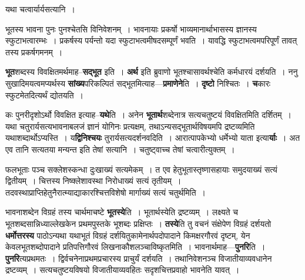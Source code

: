 \documentclass[article,12pt,a4paper]{memoir}
\begin{document}
	  \pstart यथा चत्वार्यार्यसत्यानि ।
	\pend
      
	  \bigskip
	  \begingroup
	

	  \pstart भूतस्य भावना पुनः पुनश्चेतसि विनिवेशनम् । भावनायाः प्रकर्षो भाव्यमानार्थाभासस्य ज्ञानस्य स्फुटाभत्वारम्भः । प्रकर्षस्य पर्यन्तो यदा स्फुटाभत्वमीषदसम्पूर्णं भवति । यावद्धि स्फुटाभत्वमपरिपूर्णं तावत् तस्य प्रकर्षगमनम् ।
	\pend
      
	  \endgroup
	

	  \pstart \textbf{भूत}शब्दस्य विवक्षितमर्थमाह--\textbf{सद्भूत} इति । \textbf{अर्थ} इति ब्रुवाणो भूतश्चासावर्थश्चेति कर्मधारयं दर्शयति । ननु सुखादिमयत्वमप्यर्थस्य \textbf{सांख्य}परिकल्पितं सद्भूतमित्याह—\textbf{प्रमाणेने}ति । \textbf{दृष्टो} निश्चितः । \textbf{च}कारः स्फुटमेतदित्यर्थं द्योतयति ।
	\pend
      

	  \pstart कः पुनरीदृशोऽर्थो विवक्षित इत्याह--\textbf{यथे}ति । अनेन \textbf{भूतार्थ}शब्देनात्र सत्यचतुष्टयं विवक्षितमिति दर्शितम् । यथा चतुरार्यसत्यभावनाबलजं ज्ञानं योगिनः प्रत्यक्षम्, तथाऽन्यसद्भूतार्थविषयमपि द्रष्टव्यमिति यथाशब्दार्थोऽप्यस्ति । य\textbf{द्विनिश्चयः} तुरार्यसत्यदर्शनवदिति ।  आरात्पापकेभ्यो धर्मेभ्यो याता इत्या\textbf{र्याः} । अत एव तानि सत्यतया मन्यन्त इति तेषां सत्यानि । चतुष्ट्वाच्च तेषां चत्वारीत्युक्तम् ।
	\pend
      

	  \pstart फलभूताः पञ्च सक्लेशस्कन्धा दुःखाख्यं सत्यमेकम् । त एव हेतुभूतास्तृष्णासहायाः समुदयाख्यं सत्यं द्वितीयम् । चित्तस्य निष्क्लेशावस्था निरोधाख्यं सत्यं तृतीयम् । तदवस्थाप्राप्तिहेतुनैरात्म्याद्याकारश्चित्तविशेषो मार्गाख्यं सत्यं चतुर्थमिति ।
	\pend
      

	  \pstart भावनाशब्देन विग्रहं तस्य चार्थमाचष्टे \textbf{भूतस्ये}ति । भूतार्थस्येति द्रष्टव्यम् । लक्ष्यते च भूतशब्दसान्निध्याल्लेखकेन प्रथमपुस्तके भूशब्दः प्रक्षिप्तः । \textbf{तस्ये}ति तु वचनं संक्षेपेण विग्रहं दर्शयतो \textbf{धर्मोत्तरस्य} पाठोऽन्यथा यथाभूतं विग्रहं दर्शयितुकामेनार्थपदोपादाने किमक्षरगौरवं दृष्टम्, येन केवलभूतशब्दोपादाने प्रतिपत्तिगौरवं लिखनाकौशलञ्चाविष्कृतमिति । भावनार्थमाह—\textbf{पुनरि}ति । \textbf{पुनरि}त्यप्रथमतः । द्विर्वचनेनाप्रथमप्रचारस्य प्राचुर्यं दर्शयति । तथानिवेशनञ्च विजा\leavevmode{}तीयाव्यवधानेन द्रष्टव्यम् । सत्यचतुष्टयविषयो विजातीयाव्यवहितः सदृशचित्तप्रवाहो भावनेति यावत् ।
	\pend
	  \bigskip
	  \begingroup
	
\end{document}
